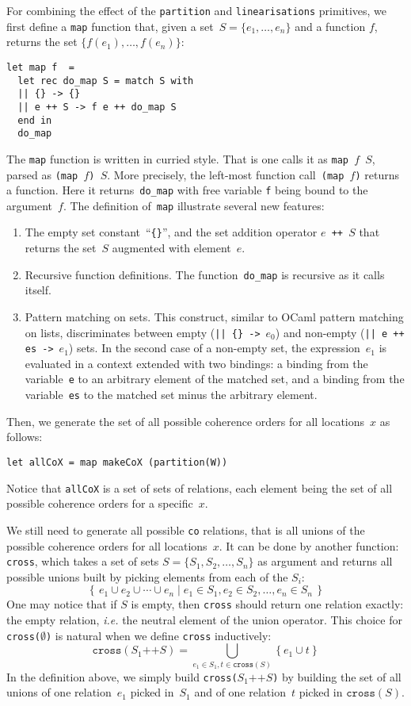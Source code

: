 For combining the effect of the \texttt{partition} and \texttt{linearisations}
primitives, we first define a \texttt{map} function that, given a set~$S=
\{e_1,\ldots,e_n\}$ and a function $f$, returns the set
$\{f(e_1),\ldots,f(e_n)\}$:
\begin{verbatim}
let map f  =
  let rec do_map S = match S with
  || {} -> {}
  || e ++ S -> f e ++ do_map S
  end in
  do_map
\end{verbatim}
The \texttt{map} function is written in curried style.
That is one calls it as \texttt{map~$f$~$S$}, parsed
as \texttt{(map~$f$)~$S$}. More precisely, the left-most function
call~\texttt{(map~$f$)} returns a function.
Here it returns~\texttt{do\_map} with free variable \texttt{f} being bound
to the argument~$f$.
The definition of~\texttt{map} illustrate several new features:
\begin{enumerate}
\item The empty set constant~``\verb+{}+'',
and the set addition operator \texttt{$e$ ++ $S$} that returns the set~$S$
augmented with element~$e$.
\item Recursive function definitions. The function~\verb+do_map+
is recursive as it calls itself.
\item Pattern matching on sets.
This construct, similar to OCaml pattern matching on lists, discriminates
between empty (\verb+|| {} ->+~$e_0$) and non-empty
(\verb!|| e ++ es ->!~$e_1$) sets.
In the second case of a non-empty set, the expression~$e_1$ is evaluated
in a context extended with two bindings: a binding from the variable~\texttt{e}
to an arbitrary element of the matched set, and a binding from
the variable~\texttt{es} to the matched set minus the arbitrary element.
\end{enumerate}

Then, we generate the set of all possible coherence orders
for all locations~$x$ as follows:
\begin{verbatim}
let allCoX = map makeCoX (partition(W))
\end{verbatim}
Notice that \texttt{allCoX} is a set of sets of relations,
each element being the set of all possible coherence orders
for a specific~$x$.  

We still need to generate all possible \texttt{co} relations,
that is all unions of the possible coherence orders for
all locations~$x$.  It can be done by another \cat{} function:
\texttt{cross}, which takes a set of sets $S = \{S_1, S_2, \ldots, S_n\}$ as
argument and returns all possible unions built by picking elements from each of
the $S_i$: 
$$
\left\{\, e_1 \cup e_2 \cup \cdots \cup e_n \mid
e_1 \in S_1, e_2 \in S_2, \ldots, e_n \in S_n \,\right\}
$$
One may notice that if $S$ is empty, then \texttt{cross} should
return one relation exactly: the empty relation, \emph{i.e.} the neutral
element of the union operator.
This choice for \texttt{cross($\emptyset$)} is natural
when we define \texttt{cross} inductively:
$$
\texttt{cross}(S_1 \mathop{\texttt{++}} S) =
\bigcup_{e_1 \in S_1, t \in \texttt{cross}(S)} \left\{ e_1 \cup t \right\}
$$
In the definition above, we simply build
\texttt{cross($S_1 \mathop{\texttt{++}} S$)} by building the set
of all unions of one relation~$e_1$ picked in~$S_1$
and of one relation~$t$ picked in $\texttt{cross}(S)$.

